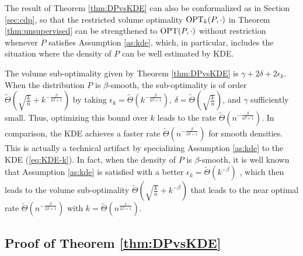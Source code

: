 The result of Theorem \ref{thm:DPvsKDE} can also be conformalized as in Section \ref{sec:cdp}, so that the restricted volume optimality $\operatorname{OPT}_k(P,\cdot)$ in Theorem \ref{thm:unsupervised} can be strengthened to $\operatorname{OPT}(P,\cdot)$ without restriction whenever $P$ satisfies Assumption \ref{as:kde}, which, in particular, includes the situation where the density of $P$ can be well estimated by KDE.

The volume sub-optimality given by Theorem \ref{thm:DPvsKDE} is $\gamma+2\delta+2\epsilon_k$. When the distribution $P$ is $\beta$-smooth, the sub-optimality is of order $\widetilde{\Theta}\left(\sqrt{\frac{k}{n}}+k^{-\frac{\beta}{2\beta+1}}\right)$ by taking $\epsilon_k=\widetilde{\Theta}\left(k^{-\frac{\beta}{2\beta+1}}\right)$, $\delta=\widetilde{\Theta}\left(\sqrt{\frac{k}{n}}\right)$, and $\gamma$ sufficiently small. Thus, optimizing this bound over $k$ leads to the rate $\widetilde{\Theta}\left(n^{-\frac{\beta}{4\beta+1}}\right)$. In comparison, the KDE achieves a faster rate $\widetilde{\Theta}\left(n^{-\frac{\beta}{2\beta+1}}\right)$ \citep{Lei2013DistributionFreePS} for smooth densities. This is actually a technical artifact by specializing Assumption \ref{as:kde} to the KDE (\ref{eq:KDE-k}). In fact, when the density of $P$ is $\beta$-smooth, it is well known that Assumption \ref{as:kde} is satisfied with a better $\epsilon_k=\widetilde{\Theta}(k^{-\beta})$ \citep{ghosal2007posterior,kruijer2010adaptive}, which then leads to the volume sub-optimality $\widetilde{\Theta}\left(\sqrt{\frac{k}{n}}+k^{-\beta}\right)$ that leads to the near optimal rate $\widetilde{\Theta}\left(n^{-\frac{\beta}{2\beta+1}}\right)$ with $k=\widetilde{\Theta}(n^{\frac{1}{2\beta+1}})$.

\subsection{Proof of Theorem \ref{thm:DPvsKDE}}

